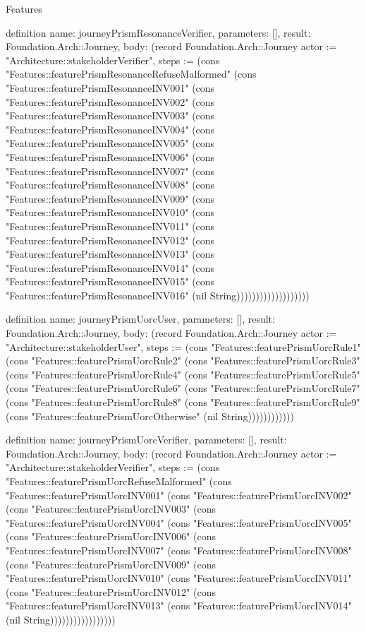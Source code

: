 \begin{lexlean}{Features}
\begin{semanticmodule}
definition{
  name: journeyPrismResonanceVerifier,
  parameters: [],
  result: Foundation.Arch::Journey,
  body: (record Foundation.Arch::Journey {actor := "Architecture::stakeholderVerifier", steps := (cons "Features::featurePrismResonanceRefuseMalformed" (cons "Features::featurePrismResonanceINV001" (cons "Features::featurePrismResonanceINV002" (cons "Features::featurePrismResonanceINV003" (cons "Features::featurePrismResonanceINV004" (cons "Features::featurePrismResonanceINV005" (cons "Features::featurePrismResonanceINV006" (cons "Features::featurePrismResonanceINV007" (cons "Features::featurePrismResonanceINV008" (cons "Features::featurePrismResonanceINV009" (cons "Features::featurePrismResonanceINV010" (cons "Features::featurePrismResonanceINV011" (cons "Features::featurePrismResonanceINV012" (cons "Features::featurePrismResonanceINV013" (cons "Features::featurePrismResonanceINV014" (cons "Features::featurePrismResonanceINV015" (cons "Features::featurePrismResonanceINV016" (nil String))))))))))))))))))})
}

definition{
  name: journeyPrismUorcUser,
  parameters: [],
  result: Foundation.Arch::Journey,
  body: (record Foundation.Arch::Journey {actor := "Architecture::stakeholderUser", steps := (cons "Features::featurePrismUorcRule1" (cons "Features::featurePrismUorcRule2" (cons "Features::featurePrismUorcRule3" (cons "Features::featurePrismUorcRule4" (cons "Features::featurePrismUorcRule5" (cons "Features::featurePrismUorcRule6" (cons "Features::featurePrismUorcRule7" (cons "Features::featurePrismUorcRule8" (cons "Features::featurePrismUorcRule9" (cons "Features::featurePrismUorcOtherwise" (nil String)))))))))))})
}

definition{
  name: journeyPrismUorcVerifier,
  parameters: [],
  result: Foundation.Arch::Journey,
  body: (record Foundation.Arch::Journey {actor := "Architecture::stakeholderVerifier", steps := (cons "Features::featurePrismUorcRefuseMalformed" (cons "Features::featurePrismUorcINV001" (cons "Features::featurePrismUorcINV002" (cons "Features::featurePrismUorcINV003" (cons "Features::featurePrismUorcINV004" (cons "Features::featurePrismUorcINV005" (cons "Features::featurePrismUorcINV006" (cons "Features::featurePrismUorcINV007" (cons "Features::featurePrismUorcINV008" (cons "Features::featurePrismUorcINV009" (cons "Features::featurePrismUorcINV010" (cons "Features::featurePrismUorcINV011" (cons "Features::featurePrismUorcINV012" (cons "Features::featurePrismUorcINV013" (cons "Features::featurePrismUorcINV014" (nil String))))))))))))))))})
}


\end{semanticmodule}
\end{lexlean}
